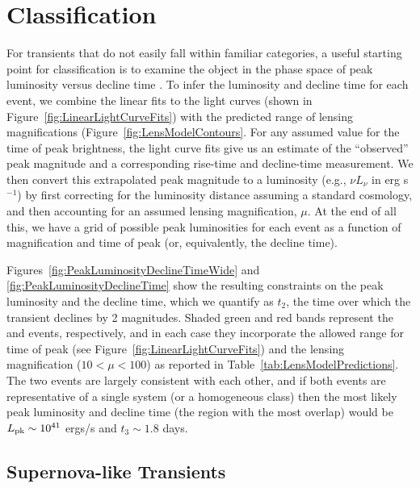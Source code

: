 \section{Classification}
\label{sec:Classification}

For transients that do not easily fall within familiar categories, a
useful starting point for classification is to examine the object in
the phase space of peak luminosity versus decline time \citep[see,
  e.g.,][]{Kasliwal:2010}.  To infer the luminosity and decline time
for each \spock event, we combine the linear fits to the light curves
(shown in Figure~\ref{fig:LinearLightCurveFits}) with the predicted
range of lensing magnifications
(Figure~\ref{fig:LensModelContours}. For any assumed value for the
time of peak brightness, the light curve fits give us an estimate of
the ``observed'' peak magnitude and a corresponding rise-time and
decline-time measurement.  We then convert this extrapolated peak
magnitude to a luminosity (e.g., $\nu L_\nu$ in erg s$^{-1}$) by
first correcting for the luminosity distance assuming a standard \LCDM
cosmology, and then accounting for an assumed lensing magnification,
$\mu$.  At the end of all this, we have a grid of possible peak
luminosities for each event as a function of magnification and time of
peak (or, equivalently, the decline time).

Figures~\ref{fig:PeakLuminosityDeclineTimeWide} and
\ref{fig:PeakLuminosityDeclineTime} show the resulting
constraints on the peak luminosity and the decline time, which we
quantify as $t_2$, the time over which the transient declines by 2
magnitudes.  Shaded green and red bands represent the \spockone and
\spocktwo events, respectively, and in each case they incorporate the
allowed range for time of peak (see
Figure~\ref{fig:LinearLightCurveFits}) and the lensing magnification
($10<\mu<100$) as reported in Table~\ref{tab:LensModelPredictions}.
The two events are largely consistent with each other, and if both
events are representative of a single system (or a homogeneous class)
then the most likely peak luminosity and decline time (the region with
the most overlap) would be $L_{\rm pk}\sim10^{41}$ ergs/s and
$t_3\sim1.8$ days.


\subsection{Supernova-like Transients}

